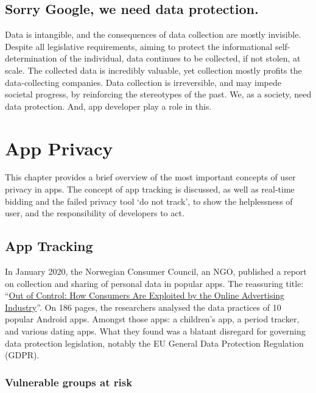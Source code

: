 \documentclass[
]{book}
\begin{document}
\hypertarget{sorry-google-we-need-data-protection.}{%
\section{Sorry Google, we need data protection.}\label{sorry-google-we-need-data-protection.}}

Data is intangible, and the consequences of data collection are mostly invisible. Despite all legislative requirements, aiming to protect the informational self-determination of the individual, data continues to be collected, if not stolen, at scale. The collected data is incredibly valuable, yet collection mostly profits the data-collecting companies. Data collection is irreversible, and may impede societal progress, by reinforcing the stereotypes of the past. We, as a society, need data protection. And, app developer play a role in this.

\hypertarget{app-privacy}{%
\chapter{App Privacy}\label{app-privacy}}

This chapter provides a brief overview of the most important concepts of user privacy in apps. The concept of app tracking is discussed, as well as real-time bidding and the failed privacy tool `do not track', to show the helplessness of user, and the responsibility of developers to act.

\hypertarget{app-tracking}{%
\section{App Tracking}\label{app-tracking}}

In January 2020, the Norwegian Consumer Council, an NGO, published a report on collection and sharing of personal data in popular apps. The reassuring title: ``\href{https://fil.forbrukerradet.no/wp-content/uploads/2020/01/2020-01-14-out-of-control-final-version.pdf}{Out of Control: How Consumers Are Exploited by the Online Advertising Industry}''. On 186 pages, the researchers analysed the data practices of 10 popular Android apps. Amongst those apps: a children's app, a period tracker, and various dating apps. What they found was a blatant disregard for governing data protection legislation, notably the EU General Data Protection Regulation (GDPR).

\hypertarget{vulnerable-groups-at-risk}{%
\subsection{Vulnerable groups at risk}\label{vulnerable-groups-at-risk}}
\end{document}
